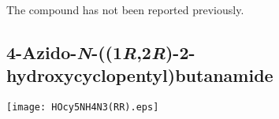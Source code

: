 \\[1\baselineskip]
\\[1\baselineskip]
\\[1\baselineskip]
The compound has not been reported previously.

\subsection{4\hyp{}Azido\hyp{}\textit{N}\hyp{}((1\textit{R},2\textit{R})\hyp{}2\hyp{}hydroxycyclopentyl)butanamide }


\begin{scheme}[H]
	\begin{center}
		\texttt{[image: HOcy5NH4N3(RR).eps]}
	\end{center}
\end{scheme}

